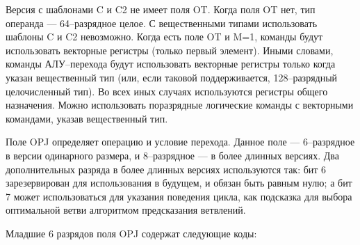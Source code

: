 \documentclass[forwardcom.tex]{subfiles}
\begin{document}
Версия с шаблонами C и C2 не имеет поля OT. Когда поля OT нет, тип операнда --- 64--разрядное целое. С вещественными типами использовать шаблоны C и C2 невозможно. Когда есть поле OT и M=1, команды будут использовать векторные регистры (только первый элемент). Иными словами, команды АЛУ--перехода будут использовать векторные регистры только когда указан вещественный тип (или, если таковой поддерживается, 128--разрядный целочисленный тип). Во всех иных случаях используются регистры общего назначения. Можно использовать поразрядные логические команды с векторными командами, указав вещественный тип.

Поле OPJ определяет операцию и условие перехода. Данное поле --- 6--разрядное в версии одинарного размера, и 8--разрядное --- в более длинных версиях. Два дополнительных разряда в более длинных версиях используются так: бит 6 зарезервирован для использования в будущем, и обязан быть равным нулю; а бит 7 может использоваться для указания поведения цикла, как подсказка для выбора оптимальной ветви алгоритмом предсказания ветвлений.

Младшие 6 разрядов поля OPJ содержат следующие коды:
\end{document}

